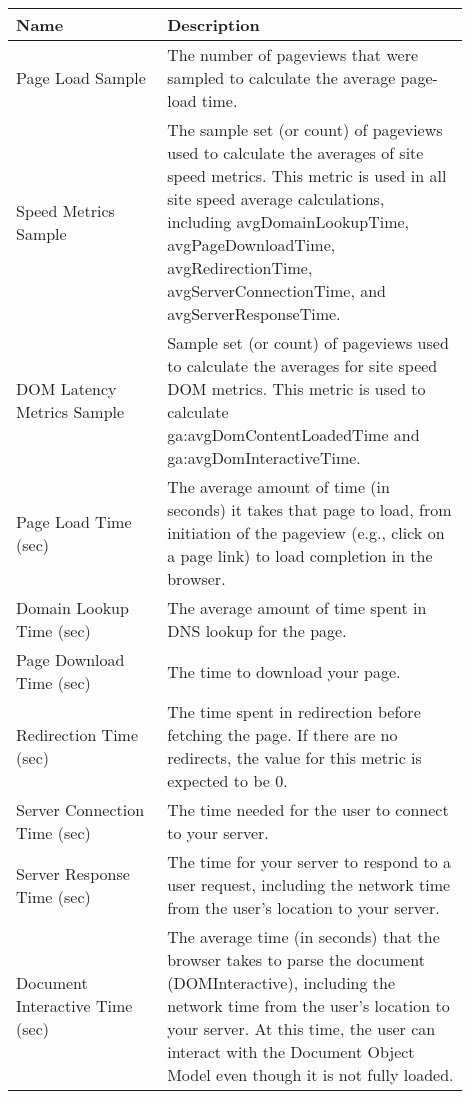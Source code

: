 \begin{center}
\small

	\begin{tabular}{ p{0.3\linewidth} | p{0.6\linewidth} }
	Name & Description  \\ 
	\hline
	Page Load Sample & The number of pageviews that were sampled to calculate the average page-load time.  \\
	
	Speed Metrics Sample & The sample set (or count) of pageviews used to calculate the averages of site speed metrics. This metric is used in all site speed average calculations, including avgDomainLookupTime, avgPageDownloadTime, avgRedirectionTime, avgServerConnectionTime, and avgServerResponseTime.  \\
	
	DOM Latency Metrics Sample & Sample set (or count) of pageviews used to calculate the averages for site speed DOM metrics. This metric is used to calculate ga:avgDomContentLoadedTime and ga:avgDomInteractiveTime.  \\

	Page Load Time (sec) & The average amount of time (in seconds) it takes that page to load, from initiation of the pageview (e.g., click on a page link) to load completion in the browser.  \\
	
	Domain Lookup Time (sec) & The average amount of time spent in DNS lookup for the page.  \\
	
	Page Download Time (sec) & The time to download your page.  \\
	
	Redirection Time (sec) & The time spent in redirection before fetching the page. If there are no redirects, the value for this metric is expected to be 0.  \\
	
	Server Connection Time (sec) & The time needed for the user to connect to your server.  \\

	Server Response Time (sec) & The time for your server to respond to a user request, including the network time from the user's location to your server.  \\
	
	Document Interactive Time (sec) & The average time (in seconds) that the browser takes to parse the document (DOMInteractive), including the network time from the user's location to your server. At this time, the user can interact with the Document Object Model even though it is not fully loaded.  \\


\end{tabular}
\end{center}
